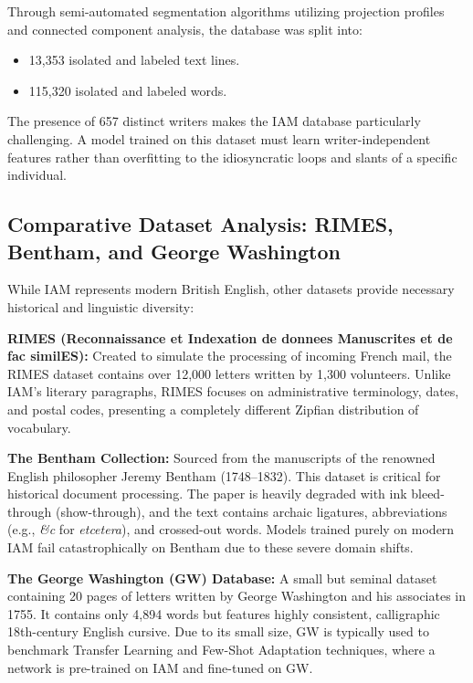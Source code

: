 Through semi-automated segmentation algorithms utilizing projection profiles and connected component analysis, the database was split into:
\begin{itemize}
    \item 13,353 isolated and labeled text lines.
    \item 115,320 isolated and labeled words.
\end{itemize}
The presence of 657 distinct writers makes the IAM database particularly challenging. A model trained on this dataset must learn writer-independent features rather than overfitting to the idiosyncratic loops and slants of a specific individual.

\subsection{Comparative Dataset Analysis: RIMES, Bentham, and George Washington}
While IAM represents modern British English, other datasets provide necessary historical and linguistic diversity:

\textbf{RIMES (Reconnaissance et Indexation de donnees Manuscrites et de fac similES):} Created to simulate the processing of incoming French mail, the RIMES dataset contains over 12,000 letters written by 1,300 volunteers. Unlike IAM's literary paragraphs, RIMES focuses on administrative terminology, dates, and postal codes, presenting a completely different Zipfian distribution of vocabulary.

\textbf{The Bentham Collection:} Sourced from the manuscripts of the renowned English philosopher Jeremy Bentham (1748–1832). This dataset is critical for historical document processing. The paper is heavily degraded with ink bleed-through (show-through), and the text contains archaic ligatures, abbreviations (e.g., \textit{\&c} for \textit{etcetera}), and crossed-out words. Models trained purely on modern IAM fail catastrophically on Bentham due to these severe domain shifts.

\textbf{The George Washington (GW) Database:} A small but seminal dataset containing 20 pages of letters written by George Washington and his associates in 1755. It contains only 4,894 words but features highly consistent, calligraphic 18th-century English cursive. Due to its small size, GW is typically used to benchmark Transfer Learning and Few-Shot Adaptation techniques, where a network is pre-trained on IAM and fine-tuned on GW.
